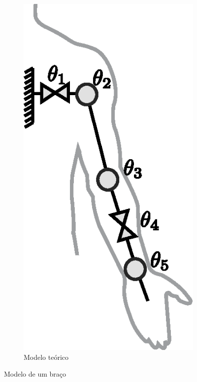 \begin{figure}[!ht]
\begin{subfigure}[b]{0.31\textwidth}
         \centering
         \includegraphics[width=\textwidth]{chapters/cap-normas/brazo3.eps}
         \caption{Modelo teórico}
         \label{fig:modelobrazo3}
     \end{subfigure}
\caption{Modelo de um braço}
\label{fig:modelobrazo}
\end{figure}

